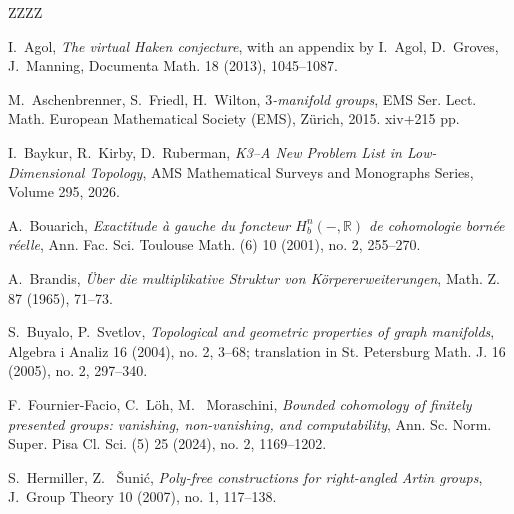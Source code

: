 \documentclass{amsart}
\numberwithin{equation}{section}
\theoremstyle{definition}
\begin{document}
\begin{thebibliography}{ZZZZ}


 {I.~Agol}, {\it The virtual Haken conjecture}, with an appendix by I.~Agol, D.~Groves, J.~Manning, Documenta Math. 18 (2013), 1045--1087.

 {M.~Aschenbrenner, S.~Friedl, H.~Wilton}, {\it $3$-manifold groups},
EMS Ser. Lect. Math.
European Mathematical Society (EMS), Zürich, 2015. xiv+215 pp.

 {I.~Baykur, R.~Kirby, D.~Ruberman}, {\it  K3--A New Problem List in Low-Dimensional Topology},  AMS Mathematical Surveys and Monographs Series, Volume 295, 2026.



 {A.~Bouarich}, {\it Exactitude à gauche du foncteur $H^n_b(-,\mathbb{R})$ de cohomologie bornée réelle},
Ann. Fac. Sci. Toulouse Math. (6) 10 (2001), no. 2, 255--270.

 {A.~Brandis}, {\it Über die multiplikative Struktur von Körpererweiterungen},
Math. Z. 87 (1965), 71--73.

 {S.~Buyalo, P.~Svetlov}, {\it Topological and geometric properties of graph manifolds}, 
Algebra i Analiz 16 (2004), no. 2, 3--68; translation in
St. Petersburg Math. J. 16 (2005), no. 2, 297--340.




 {F.~Fournier-Facio, C.~Löh, M.~ Moraschini}, {\it Bounded cohomology of finitely presented groups: vanishing, non-vanishing, and computability}, 
Ann. Sc. Norm. Super. Pisa Cl. Sci. (5) 25 (2024), no. 2, 1169--1202.


 {S.~Hermiller, Z.~ Šunić}, {\it Poly-free constructions for right-angled Artin groups},
J.~Group Theory 10 (2007), no. 1, 117--138.


\end{thebibliography}
\end{document}
